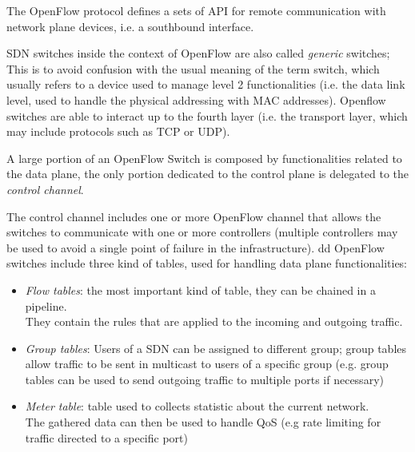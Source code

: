 \documentclass{article}
\begin{document}
	The OpenFlow protocol defines a sets of API for remote communication with network plane devices, i.e. a southbound interface.
	
	
	SDN switches inside the context of OpenFlow are also called \textit{generic} switches;
	This is to avoid confusion with the usual meaning of the term switch, which usually refers to a device used to manage level 2 functionalities (i.e. the data link level, used to handle the physical addressing with MAC addresses). 
	Openflow switches are able to interact up to the fourth layer (i.e. the transport layer, which may include protocols such as TCP or UDP).
	
	A large portion of an OpenFlow Switch is composed by functionalities related to the data plane, the only portion dedicated to the control plane is delegated to the \textit{control channel}.
	
	The control channel includes one or more OpenFlow channel that allows the switches to communicate with one or more controllers (multiple controllers may be used to avoid a single point of failure in the infrastructure).
	dd
	OpenFlow switches include three kind of tables, used for handling data plane functionalities:
	
	\begin{itemize}
		\item \textit{Flow tables}: the most important kind of table, they can be chained in a pipeline. \\
		They contain the rules that are applied to the incoming and outgoing traffic.
		\item \textit{Group tables}: Users of a SDN can be assigned to different group; group tables allow traffic to be sent in multicast to users of a specific group (e.g. group tables can be used to send outgoing traffic to multiple ports if necessary)
		\item \textit{Meter table}: table used to collects statistic about the current network. \\
		The gathered data can then be used to handle QoS (e.g rate limiting for traffic directed to a specific port)
	\end{itemize}
	 
\end{document}

